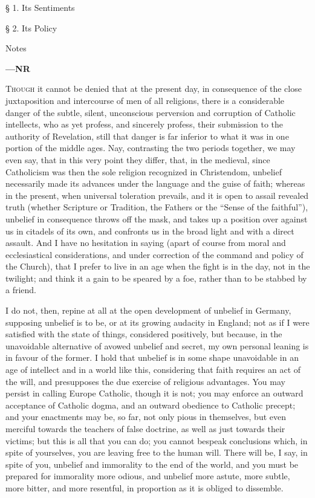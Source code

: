 
§ 1. Its Sentiments

§ 2. Its Policy

Notes

\textbf{—NR}


T\textsc{hough} it cannot be denied that at the present day, in
consequence of the close juxtaposition and intercourse of men of all
religions, there is a considerable danger of the subtle, silent,
unconscious perversion and corruption of Catholic intellects, who as
yet profess, and sincerely profess, their submission to the authority
of Revelation, still that danger is far inferior to what it was in one
portion of the middle ages. Nay, contrasting the two periods together,
we may even say, that in this very point they differ, that, in the
medieval, since Catholicism was then the sole religion recognized in
Christendom, unbelief necessarily made its advances under the language
and the guise of faith; whereas in the present, when universal
toleration prevails, and it is open to assail revealed truth (whether
Scripture or Tradition, the Fathers or the ``Sense of the
faithful''), unbelief in consequence throws off the mask, and
takes up a position over against us in citadels of its own, and
confronts us in the broad light and with a direct assault. And I have
no hesitation in saying (apart of course from moral and ecclesiastical
considerations, and under correction of the command and policy
of the Church), that I prefer to live in an age when the fight is in
the day, not in the twilight; and think it a gain to be speared by a
foe, rather than to be stabbed by a friend.

I do not, then, repine at all at the open development of unbelief
in Germany, supposing unbelief is to be, or at its growing audacity in
England; not as if I were satisfied with the state of things,
considered positively, but because, in the unavoidable alternative of
avowed unbelief and secret, my own personal leaning is in favour of
the former. I hold that unbelief is in some shape unavoidable in an
age of intellect and in a world like this, considering that faith
requires an act of the will, and presupposes the due exercise of
religious advantages. You may persist in calling Europe Catholic,
though it is not; you may enforce an outward acceptance of Catholic
dogma, and an outward obedience to Catholic precept; and your
enactments may be, so far, not only pious in themselves, but even
merciful towards the teachers of false doctrine, as well as just
towards their victims; but this is all that you can do; you cannot
bespeak conclusions which, in spite of yourselves, you are leaving
free to the human will. There will be, I say, in spite of you,
unbelief and immorality to the end of the world, and you must be
prepared for immorality more odious, and unbelief more astute, more
subtle, more bitter, and more resentful, in proportion as it is
obliged to dissemble.

